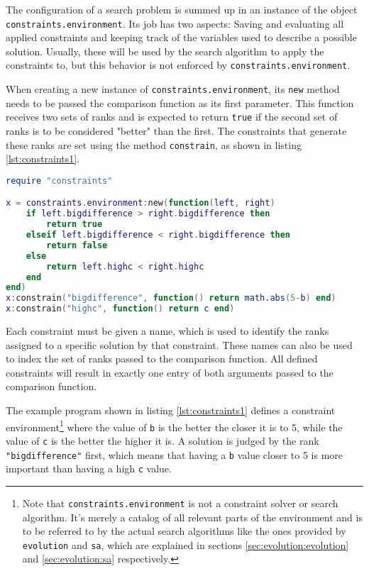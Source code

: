 The configuration of a search problem is summed up in an instance of the object \texttt{constraints.environment}. Its job has two aspects: Saving and evaluating all applied constraints and keeping track of the variables used to describe a possible solution. Usually, these will be used by the search algorithm to apply the constraints to, but this behavior is not enforced by \texttt{constraints.environment}.

When creating a new instance of \texttt{constraints.environment}, its \texttt{new} method needs to be passed the comparison function as its first parameter. This function receives two sets of ranks and is expected to return \texttt{true} if the second set of ranks is to be considered "better" than the first. The constraints that generate these ranks are set using the method \texttt{constrain}, as shown in listing \ref{lst:constraints1}.

\begin{lstlisting}[language=lua, caption={Example set up of \texttt{constraints.environment}}, label=lst:constraints1, name=lst:constraints]
require "constraints"

x = constraints.environment:new(function(left, right)
	if left.bigdifference > right.bigdifference then
		return true
	elseif left.bigdifference < right.bigdifference then
		return false
	else
		return left.highc < right.highc
	end
end)
x:constrain("bigdifference", function() return math.abs(5-b) end)
x:constrain("highc", function() return c end)
\end{lstlisting}

Each constraint must be given a name, which is used to identify the ranks assigned to a specific solution by that constraint. These names can also be used to index the set of ranks passed to the comparison function. All defined constraints will result in exactly one entry of both arguments passed to the comparison function. 

The example program shown in listing \ref{lst:constraints1} defines a constraint environment\footnote{Note that \texttt{constraints.environment} is not a constraint solver or search algorithm. It's merely a catalog of all relevant parts of the environment and is to be referred to by the actual search algorithms like the ones provided by \texttt{evolution} and \texttt{sa}, which are explained in sections \ref{sec:evolution:evolution} and \ref{sec:evolution:sa} respectively.} where the value of \texttt{b} is the better the closer it is to 5, while the value of \texttt{c} is the better the higher it is. A solution is judged by the rank \texttt{"bigdifference"} first, which means that having a \texttt{b} value closer to 5 is more important than having a high \texttt{c} value.

